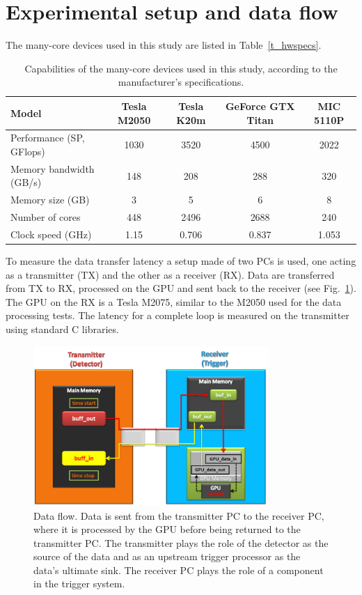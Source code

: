 \documentclass[letterpaper]{jpconf}
\begin{document}
\section{Experimental setup and data flow}

The many-core devices used in this study are listed in Table~\ref{t_hwspecs}.

\begin{table}[!t]
  \centering
  \begin{tabular}{|l|c|c|c|c|}
    \hline
    Model & Tesla M2050 & Tesla K20m & GeForce GTX  Titan & MIC 5110P \\
    \hline
    \hline
    Performance (SP, GFlops) & 1030 & 3520 & 4500 & 2022 \\
    Memory bandwidth  (GB/s) & 148 & 208 & 288  & 320\\   
    Memory size (GB) & 3 & 5 & 6 & 8 \\
    Number of cores & 448 & 2496 & 2688 & 240 \\
    Clock speed (GHz) & 1.15 & 0.706 & 0.837 & 1.053 \\
    \hline
  \end{tabular}
  \caption{Capabilities of the many-core devices used in this study, according to the manufacturer's specifications.}
  \label{tab_hwspecs}
\end{table}

To measure the data transfer latency a setup made of two PCs is used, 
one acting as a transmitter (TX) and the
other as a receiver (RX).  Data are transferred from TX to RX,
processed on the GPU and sent back to the receiver (see
Fig.~\ref{fig_data_flow}).  
The GPU on the RX is a Tesla M2075, similar to the M2050 used for the data processing tests. The latency for a complete loop is
measured on the transmitter using standard C libraries.


\begin{figure}[!h]
\centering
\includegraphics[width=3.5in]{figures/SetUp-general}
\caption{Data flow. Data is sent from the transmitter PC to the
  receiver PC, where it is processed by the GPU before being returned
  to the transmitter PC. The transmitter plays the role of the
  detector as the source of the data and as an upstream trigger
  processor as the data's ultimate sink. The receiver PC plays the
  role of a component in the trigger system. }
\label{fig_data_flow}
\end{figure}
\end{document}
